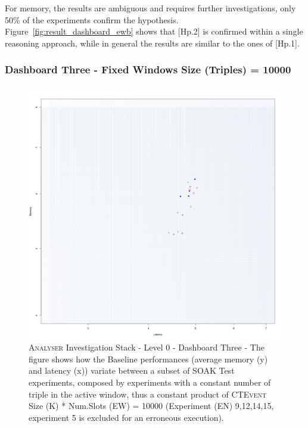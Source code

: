 For memory, the results are ambiguous and requires further investigations, only 50\% of the experiments confirm the hypothesis. Figure~\ref{fig:result_dashboard_ewb} shows that [Hp.2] is confirmed within a single reasoning approach, while in general the results are similar to the ones of [Hp.1].

\subsubsection{Dashboard Three - Fixed Windows Size (Triples) = 10000 } 

\begin{figure}[h!tbp]
	\centering
	\includegraphics[width=0.9\linewidth]{images/dashboard-3}	
	\caption[\textsc{Analyser} Investigation Stack - Level 0 - Dashboard Three - Multiplot Version]	{\textsc{Analyser} Investigation Stack - Level 0 - Dashboard Three - The figure shows how the Baseline performances (average memory (y) and latency (x))  variate between a subset of SOAK Test experiments, composed by experiments with a constant number of triple in the active window, thus a constant product of \textsc{CTEvent} Size (K) * Num.Slots (EW) = 10000 (Experiment (EN) 9,12,14,15, experiment 5 is excluded for an erroneous execution).}
	\label{fig:result_dashboard_probb}
\end{figure}

